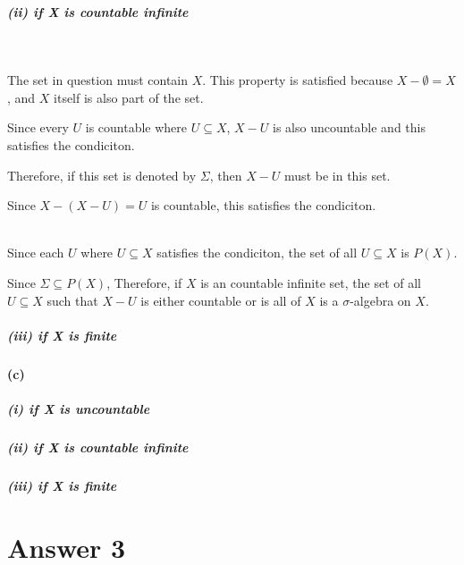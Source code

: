 \documentclass[12pt]{article}
\begin{document}
\subparagraph{(ii) if X is countable infinite}
\ \\
\par \hspace*{1em}The set in question must contain \(X\). This property is satisfied because \( X - \emptyset = X \), and \( X \) itself is also part of the set. \\
\par \hspace*{1em}Since every \(U\) is countable where \( U \subseteq X \), \(X-U\) is also uncountable and this satisfies the condiciton. \\
\par \hspace*{1em}Therefore, if this set is denoted by \( \Sigma \), then \( X-U \) must be in this set. \\
\par \hspace*{1em}Since \( X - (X-U) = U\) is countable, this satisfies the condiciton. \\ \\

\par \hspace*{1em}Since each \( U \) where \( U \subseteq X \) satisfies the condiciton, the set of all \( U \subseteq X \) is \( P(X) \). \\
\par \hspace*{1em}Since \( \Sigma \subseteq P(X) \), Therefore, if \( X \) is an countable infinite set, the set of all \( U \subseteq X \) such that \( X - U \) is either countable or is all of \(X\) is a \( \sigma \)-algebra on \( X \).
\subparagraph{(iii) if X is finite}

\paragraph{(c)}
\subparagraph{(i) if X is uncountable}
\subparagraph{(ii) if X is countable infinite}
\subparagraph{(iii) if X is finite}


\section*{Answer 3}
\end{document}
